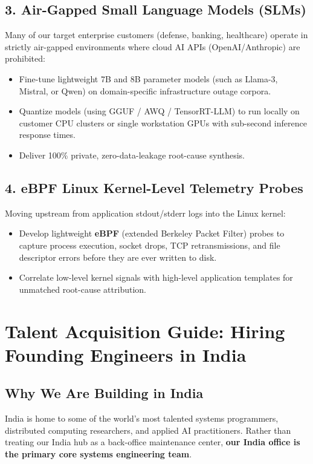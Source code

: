\documentclass[11pt,a4paper]{article}
\begin{document}
\subsection{3. Air-Gapped Small Language Models (SLMs)}
Many of our target enterprise customers (defense, banking, healthcare) operate in strictly air-gapped environments where cloud AI APIs (OpenAI/Anthropic) are prohibited:
\begin{itemize}[leftmargin=*]
    \item Fine-tune lightweight 7B and 8B parameter models (such as Llama-3, Mistral, or Qwen) on domain-specific infrastructure outage corpora.
    \item Quantize models (using GGUF / AWQ / TensorRT-LLM) to run locally on customer CPU clusters or single workstation GPUs with sub-second inference response times.
    \item Deliver 100\% private, zero-data-leakage root-cause synthesis.
\end{itemize}

\subsection{4. eBPF Linux Kernel-Level Telemetry Probes}
Moving upstream from application stdout/stderr logs into the Linux kernel:
\begin{itemize}[leftmargin=*]
    \item Develop lightweight \textbf{eBPF} (extended Berkeley Packet Filter) probes to capture process execution, socket drops, TCP retransmissions, and file descriptor errors before they are ever written to disk.
    \item Correlate low-level kernel signals with high-level application templates for unmatched root-cause attribution.
\end{itemize}

\newpage

\section{Talent Acquisition Guide: Hiring Founding Engineers in India}

\subsection{Why We Are Building in India}
India is home to some of the world's most talented systems programmers, distributed computing researchers, and applied AI practitioners. Rather than treating our India hub as a back-office maintenance center, \textbf{our India office is the primary core systems engineering team}. 
\end{document}
